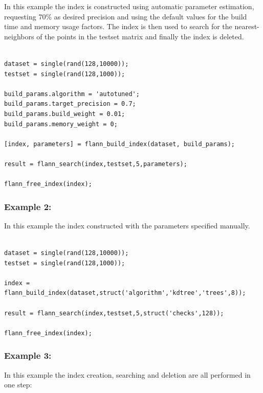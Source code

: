 \documentclass[letter,10pt]{article}
\begin{document}
In this example the index is constructed using automatic parameter estimation, requesting 70\% as desired precision and using the default values for the build time and memory usage factors. The index is then used to search for the nearest-neighbors of the points in the testset matrix and finally the index is deleted.

\begin{Verbatim}[fontsize=\footnotesize,frame=single]

dataset = single(rand(128,10000));
testset = single(rand(128,1000));

build_params.algorithm = 'autotuned';
build_params.target_precision = 0.7;
build_params.build_weight = 0.01;
build_params.memory_weight = 0;

[index, parameters] = flann_build_index(dataset, build_params);

result = flann_search(index,testset,5,parameters);

flann_free_index(index);

\end{Verbatim}




% 
% 


\subsubsection{Example 2:}

In this example the index constructed with the parameters specified manually.

\begin{Verbatim}[fontsize=\footnotesize,frame=single]

dataset = single(rand(128,10000));
testset = single(rand(128,1000));

index = flann_build_index(dataset,struct('algorithm','kdtree','trees',8));

result = flann_search(index,testset,5,struct('checks',128));

flann_free_index(index);

\end{Verbatim}

\subsubsection{Example 3:}

In this example the index creation, searching and deletion are all performed in one step:
\end{document}
